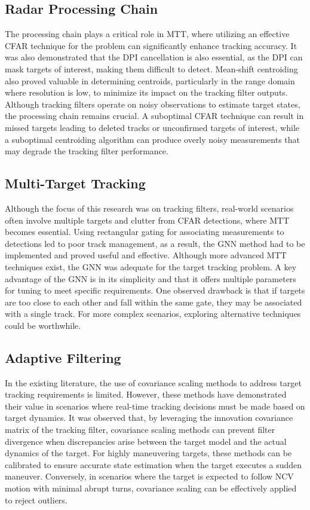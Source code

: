 \subsection{Radar Processing Chain}
The processing chain plays a critical role in \ac{MTT}, where utilizing an effective \ac{CFAR} technique for the problem can significantly enhance tracking accuracy. It was also demonstrated that the \ac{DPI} cancellation is also essential, as the \ac{DPI} can mask targets of interest, making them difficult to detect. Mean-shift centroiding also proved valuable in determining centroids, particularly in the range domain where resolution is low, to minimize its impact on the tracking filter outputs. Although tracking filters operate on noisy observations to estimate target states, the processing chain remains crucial. A suboptimal \ac{CFAR} technique can result in missed targets leading to deleted tracks or unconfirmed targets of interest, while a suboptimal centroiding algorithm can produce overly noisy measurements that may degrade the tracking filter performance.

\subsection{Multi-Target Tracking}
Although the focus of this research was on tracking filters, real-world scenarios often involve multiple targets and clutter from \ac{CFAR} detections, where \ac{MTT} becomes essential. Using rectangular gating for associating measurements to detections led to poor track management, as a result, the \ac{GNN} method had to be implemented and proved useful and effective. Although more advanced \ac{MTT} techniques exist, the \ac{GNN} was adequate for the target tracking problem. A key advantage of the \ac{GNN} is in its simplicity and that it offers multiple parameters for tuning to meet specific requirements. One observed drawback is that if targets are too close to each other and fall within the same gate, they may be associated with a single track. For more complex scenarios, exploring alternative techniques could be worthwhile.

\subsection{Adaptive Filtering}
In the existing literature, the use of covariance scaling methods to address target tracking requirements is limited. However, these methods have demonstrated their value in scenarios where real-time tracking decisions must be made based on target dynamics. It was observed that, by leveraging the innovation covariance matrix of the tracking filter, covariance scaling methods can prevent filter divergence when discrepancies arise between the target model and the actual dynamics of the target. For highly maneuvering targets, these methods can be calibrated to ensure accurate state estimation when the target executes a sudden maneuver. Conversely, in scenarios where the target is expected to follow \ac{NCV} motion with minimal abrupt turns, covariance scaling can be effectively applied to reject outliers.


